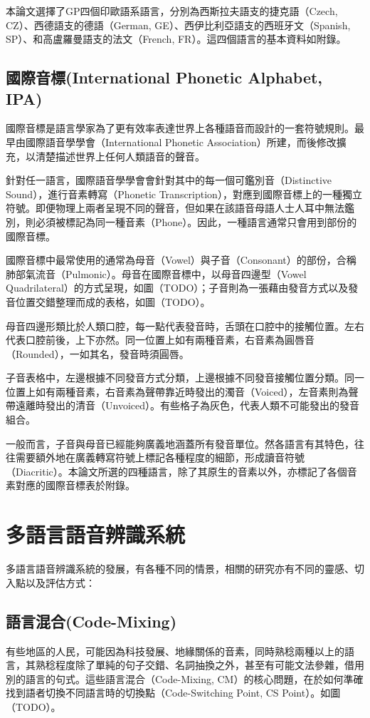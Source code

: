 本論文選擇了GP四個印歐語系語言，分別為西斯拉夫語支的捷克語（Czech, CZ）、西德語支的德語（German, GE）、西伊比利亞語支的西班牙文（Spanish, SP）、和高盧羅曼語支的法文（French, FR）。這四個語言的基本資料如附錄。
\subsection{國際音標(International Phonetic Alphabet, IPA)}
國際音標是語言學家為了更有效率表達世界上各種語音而設計的一套符號規則。最早由國際語音學學會（International Phonetic Association）所建，而後修改擴充，以清楚描述世界上任何人類語音的聲音。

針對任一語言，國際語音學學會會針對其中的每一個可鑑別音（Distinctive Sound），進行音素轉寫（Phonetic Transcription），對應到國際音標上的一種獨立符號。即便物理上兩者呈現不同的聲音，但如果在該語音母語人士人耳中無法鑑別，則必須被標記為同一種音素（Phone）。因此，一種語言通常只會用到部份的國際音標。

國際音標中最常使用的通常為母音（Vowel）與子音（Consonant）的部份，合稱肺部氣流音（Pulmonic）。母音在國際音標中，以母音四邊型（Vowel Quadrilateral）的方式呈現，如圖（TODO）；子音則為一張藉由發音方式以及發音位置交錯整理而成的表格，如圖（TODO）。

母音四邊形類比於人類口腔，每一點代表發音時，舌頭在口腔中的接觸位置。左右代表口腔前後，上下亦然。同一位置上如有兩種音素，右音素為圓唇音（Rounded），一如其名，發音時須圓唇。

子音表格中，左邊根據不同發音方式分類，上邊根據不同發音接觸位置分類。同一位置上如有兩種音素，右音素為聲帶靠近時發出的濁音（Voiced），左音素則為聲帶遠離時發出的清音（Unvoiced）。有些格子為灰色，代表人類不可能發出的發音組合。

一般而言，子音與母音已經能夠廣義地涵蓋所有發音單位。然各語言有其特色，往往需要額外地在廣義轉寫符號上標記各種程度的細節，形成讀音符號（Diacritic）。本論文所選的四種語言，除了其原生的音素以外，亦標記了各個音素對應的國際音標表於附錄。

\section{多語言語音辨識系統}
多語言語音辨識系統的發展，有各種不同的情景，相關的研究亦有不同的靈感、切入點以及評估方式：
\subsection{語言混合(Code-Mixing)}
有些地區的人民，可能因為科技發展、地緣關係的音素，同時熟稔兩種以上的語言，其熟稔程度除了單純的句子交錯、名詞抽換之外，甚至有可能文法參雜，借用別的語言的句式。這些語言混合（Code-Mixing, CM）的核心問題，在於如何準確找到語者切換不同語言時的切換點（Code-Switching Point, CS Point）。如圖（TODO）。

